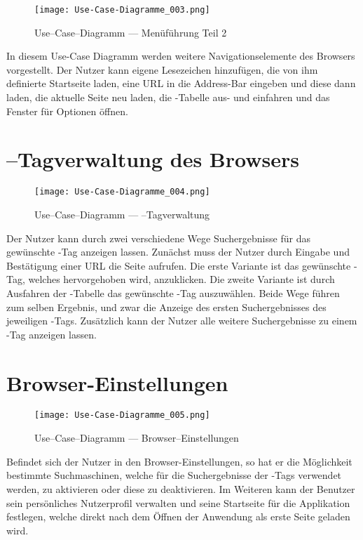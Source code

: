 \begin{figure}[htb]
\texttt{[image: Use-Case-Diagramme\_003.png]}
	\caption{Use--Case--Diagramm --- Menüführung Teil 2}
	\label{fig:Menüführung Teil 2}
\end{figure}
In diesem Use-Case Diagramm werden weitere Navigationselemente des Browsers vorgestellt. Der Nutzer kann eigene Lesezeichen hinzufügen, die von ihm definierte Startseite laden, eine URL in die Address-Bar eingeben und diese dann laden, die aktuelle Seite neu laden, die \SEARCH-Tabelle aus- und einfahren und das Fenster für Optionen öffnen.

\section{\SEARCH--Tagverwaltung des Browsers}
\begin{figure}[htb]
\texttt{[image: Use-Case-Diagramme\_004.png]}
	\caption{Use--Case--Diagramm --- \SEARCH--Tagverwaltung}
	\label{fig:SEARCH-Tagverwaltung}
\end{figure}
Der Nutzer kann durch zwei verschiedene Wege Suchergebnisse für das gewünschte \SEARCH-Tag anzeigen lassen. Zunächst muss der Nutzer durch Eingabe und Bestätigung einer URL die Seite aufrufen. Die erste Variante ist das gewünschte \SEARCH-Tag, welches hervorgehoben wird, anzuklicken. Die zweite Variante ist durch Ausfahren der \SEARCH-Tabelle das gewünschte \SEARCH-Tag auszuwählen. Beide Wege führen zum selben Ergebnis, und zwar die Anzeige des ersten Suchergebnisses des jeweiligen \SEARCH-Tags. Zusätzlich kann der Nutzer alle weitere Suchergebnisse zu einem \SEARCH-Tag anzeigen lassen.

\section{Browser-Einstellungen}
\begin{figure}[htb]
\texttt{[image: Use-Case-Diagramme\_005.png]}
	\caption{Use--Case--Diagramm --- Browser--Einstellungen}
	\label{fig:Browser-Einstellungen}
\end{figure}
Befindet sich der Nutzer in den Browser-Einstellungen, so hat er die Möglichkeit bestimmte Suchmaschinen, welche für die Suchergebnisse der \SEARCH-Tags verwendet werden, zu aktivieren oder diese zu deaktivieren. Im Weiteren kann der Benutzer sein persönliches Nutzerprofil verwalten und seine Startseite für die Applikation festlegen, welche direkt nach dem Öffnen der Anwendung als erste Seite geladen wird.
